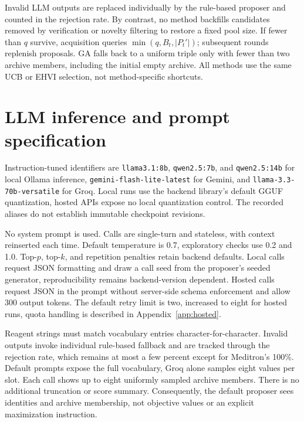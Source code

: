 Invalid LLM outputs are replaced individually by the rule-based proposer and counted in the rejection rate. By contrast, no method backfills candidates removed by verification or novelty filtering to restore a fixed pool size. If fewer than $q$ survive, acquisition queries $\min(q,B_t,|P_t'|)$; subsequent rounds replenish proposals. GA falls back to a uniform triple only with fewer than two archive members, including the initial empty archive. All methods use the same UCB or EHVI selection, not method-specific shortcuts.

\section{LLM inference and prompt specification}
\label{app:llm-repro}
Instruction-tuned identifiers are \texttt{llama3.1:8b}, \texttt{qwen2.5:7b}, and \texttt{qwen2.5:14b} for local Ollama inference, \texttt{gemini-flash-lite-latest} for Gemini, and \texttt{llama-3.3-70b-versatile} for Groq. Local runs use the backend library's default GGUF quantization, hosted APIs expose no local quantization control. The recorded aliases do not establish immutable checkpoint revisions.

No system prompt is used. Calls are single-turn and stateless, with context reinserted each time. Default temperature is 0.7, exploratory checks use 0.2 and 1.0. Top-$p$, top-$k$, and repetition penalties retain backend defaults. Local calls request JSON formatting and draw a call seed from the proposer's seeded generator, reproducibility remains backend-version dependent. Hosted calls request JSON in the prompt without server-side schema enforcement and allow 300 output tokens. The default retry limit is two, increased to eight for hosted runs, quota handling is described in Appendix~\ref{app:hosted}.

Reagent strings must match vocabulary entries character-for-character. Invalid outputs invoke individual rule-based fallback and are tracked through the rejection rate, which remains at most a few percent except for Meditron's 100\%. Default prompts expose the full vocabulary, Groq alone samples eight values per slot. Each call shows up to eight uniformly sampled archive members. There is no additional truncation or score summary. Consequently, the default proposer sees identities and archive membership, not objective values or an explicit maximization instruction.

